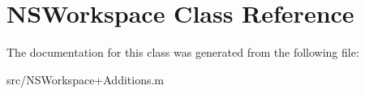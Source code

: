 \hypertarget{class_n_s_workspace}{
\section{NSWorkspace Class Reference}
\label{class_n_s_workspace}
}


The documentation for this class was generated from the following file:\begin{DoxyCompactItemize}
\item 
src/NSWorkspace+Additions.m\end{DoxyCompactItemize}

